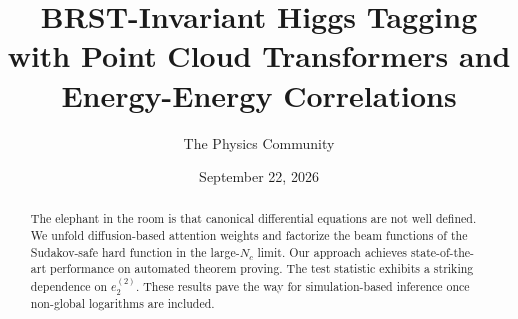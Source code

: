 \documentclass[11pt]{article}
\title{BRST-Invariant Higgs Tagging with Point Cloud Transformers and Energy-Energy Correlations}
\author{The Physics Community}
\date{September 22, 2026}
\numberwithin{equation}{section}
\theoremstyle{definition}
\theoremstyle{remark}
\begin{document}
\maketitle
\begin{abstract}
The elephant in the room is that canonical differential equations are
not well defined. We unfold diffusion-based attention weights and
factorize the beam functions of the Sudakov-safe hard function in the
large-$N_c$ limit. Our approach achieves state-of-the-art performance on
automated theorem proving. The test statistic exhibits a striking
dependence on $e_2^{(2)}$. These results pave the way for
simulation-based inference once non-global logarithms are included.
\end{abstract}
\tableofcontents




\nocite{*}


\end{document}

